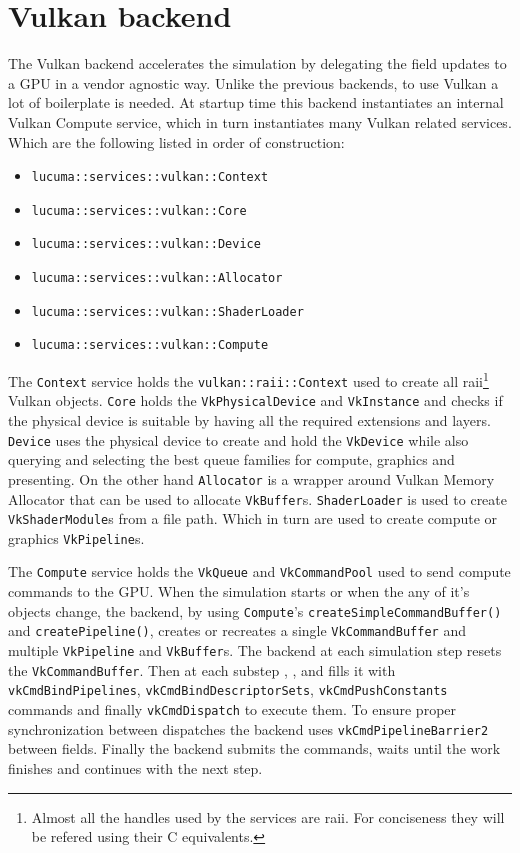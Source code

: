 \documentclass[../main.tex]{subfiles}
\begin{document}
\section{Vulkan backend}
The Vulkan backend accelerates the simulation by delegating the field updates to a GPU in a vendor agnostic way.
Unlike the previous backends, to use Vulkan a lot of boilerplate is needed.
At startup time this backend instantiates an internal Vulkan Compute service, which in turn instantiates many Vulkan related services.
Which are the following listed in order of construction:
\begin{itemize}
	\item \texttt{lucuma::services::vulkan::Context}
	\item \texttt{lucuma::services::vulkan::Core}
	\item \texttt{lucuma::services::vulkan::Device}
	\item \texttt{lucuma::services::vulkan::Allocator}
	\item \texttt{lucuma::services::vulkan::ShaderLoader}
	\item \texttt{lucuma::services::vulkan::Compute}
\end{itemize}

The \texttt{Context} service holds the \texttt{vulkan::raii::Context} used to create all raii\footnote{Almost all the handles used by the services are raii. For conciseness they will be refered using their C equivalents.} Vulkan objects.
\texttt{Core} holds the \texttt{VkPhysicalDevice} and \texttt{VkInstance} and checks if the physical device is suitable by having all the required extensions and layers. \texttt{Device} uses the physical device to create and hold the \texttt{VkDevice} while also querying and selecting the best queue families for compute, graphics and presenting.
On the other hand \texttt{Allocator} is a wrapper around Vulkan Memory Allocator\citep{vma} that can be used to allocate \texttt{VkBuffer}s.
\texttt{ShaderLoader} is used to create \texttt{VkShaderModule}s from a file path. Which in turn are used to create compute or graphics \texttt{VkPipeline}s.

The \texttt{Compute} service holds the \texttt{VkQueue} and \texttt{VkCommandPool} used to send compute commands to the GPU.
When the simulation starts or when the any of it's objects change, the backend, by using \texttt{Compute}'s \texttt{createSimpleCommandBuffer()} and \texttt{createPipeline()}, creates or recreates a single \texttt{VkCommandBuffer} and multiple \texttt{VkPipeline} and \texttt{VkBuffer}s.
The backend at each simulation step resets the \texttt{VkCommandBuffer}.
Then at each substep
,
,
 and
fills it with \texttt{vkCmdBindPipelines}, \texttt{vkCmdBindDescriptorSets}, \texttt{vkCmdPushConstants} commands and
finally \texttt{vkCmdDispatch} to execute them.
To ensure proper synchronization between dispatches the backend uses \texttt{vkCmdPipelineBarrier2} between fields.
Finally the backend submits the commands, waits until the work finishes and continues with the next step.
\end{document}
